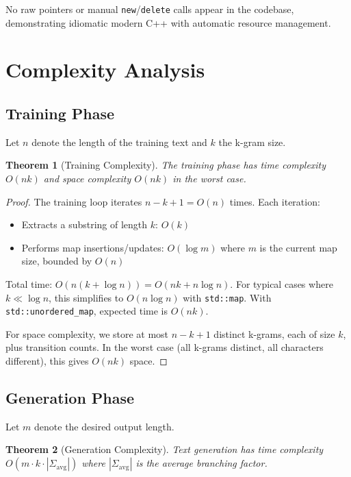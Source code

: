 \documentclass[11pt,letterpaper]{article}
\newtheorem{theorem}{Theorem}
\begin{document}
No raw pointers or manual \texttt{new}/\texttt{delete} calls appear in the codebase, demonstrating idiomatic modern C++ with automatic resource management.

\section{Complexity Analysis}\label{sec:analysis}

\subsection{Training Phase}

Let $n$ denote the length of the training text and $k$ the k-gram size.

\begin{theorem}[Training Complexity]
The training phase has time complexity $O(nk)$ and space complexity $O(nk)$ in the worst case.
\end{theorem}

\begin{proof}
The training loop iterates $n - k + 1 = O(n)$ times. Each iteration:
\begin{itemize}
    \item Extracts a substring of length $k$: $O(k)$
    \item Performs map insertions/updates: $O(\log m)$ where $m$ is the current map size, bounded by $O(n)$
\end{itemize}

Total time: $O(n(k + \log n)) = O(nk + n\log n)$. For typical cases where $k \ll \log n$, this simplifies to $O(n\log n)$ with \texttt{std::map}. With \texttt{std::unordered\_map}, expected time is $O(nk)$.

For space complexity, we store at most $n - k + 1$ distinct k-grams, each of size $k$, plus transition counts. In the worst case (all k-grams distinct, all characters different), this gives $O(nk)$ space.
\end{proof}

\subsection{Generation Phase}

Let $m$ denote the desired output length.

\begin{theorem}[Generation Complexity]
Text generation has time complexity $O(m \cdot k \cdot |\Sigma_{\text{avg}}|)$ where $|\Sigma_{\text{avg}}|$ is the average branching factor.
\end{theorem}
\end{document}
